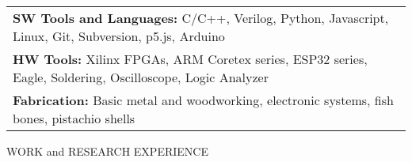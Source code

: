 \documentclass[11pt]{article}
\begin{document}
\begin{tabularx}{\textwidth}{l}
{\bf SW Tools and Languages:} C/C++, Verilog, Python, Javascript, Linux, Git, Subversion, p5.js, Arduino \\ %

{\bf HW Tools:} Xilinx FPGAs, ARM Coretex series, ESP32 series, Eagle, Soldering, Oscilloscope, Logic Analyzer \\ 

{\bf Fabrication:} Basic metal and woodworking, electronic systems, fish bones, pistachio shells 




\end{tabularx}
\vspace{-.2cm}


\hrulefill

WORK and RESEARCH EXPERIENCE
\end{document}

